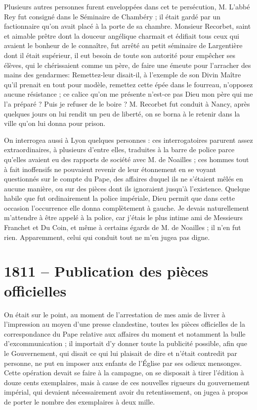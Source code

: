 \documentclass[11pt,a4paper]{report}
\begin{document}
Plusieurs autres personnes furent enveloppées dans cet te persécution, M. L'abbé Rey fut consigné dans le Séminaire de Chambéry ; il était gardé par un factionnaire qu'on avait placé à la porte de sa chambre. Monsieur Recorbet, saint et aimable prêtre dont la douceur angélique charmait et édifiait tous ceux qui avaient le bonheur de le connaître, fut arrêté au petit séminaire de Largentière dont il était supérieur, il eut besoin de toute son autorité pour empêcher ses élèves, qui le chérissaient comme un père, de faire une émeute pour l'arracher des mains des gendarmes: Remettez-leur disait-il, à l'exemple de son Divin Maître qu'il prenait en tout pour modèle, remettez cette épée dans le fourreau, n'opposez aucune résistance ; ce calice qu'on me présente n'est-ce pas Dieu mon père qui me l'a préparé ? Puis je refuser de le boire ? M. Recorbet fut conduit à Nancy, après quelques jours on lui rendit un peu de liberté, on se borna à le retenir dans la ville qu'on lui donna pour prison.

On interrogea aussi à Lyon quelques personnes : ces interrogatoires parurent assez extraordinaires, à plusieurs d'entre elles, traduites à la barre de police parce qu'elles avaient eu des rapports de société avec M. de Noailles ; ces hommes tout à fait inoffensifs ne pouvaient revenir de leur étonnement en se voyant questionnés sur le compte du Pape, des affaires duquel ils ne s'étaient mêlés en aucune manière, ou sur des pièces dont ils ignoraient jusqu'à l'existence. Quelque habile que fut ordinairement la police impériale, Dieu permit que dans cette occasion l'occurrence elle donna complètement à gauche. Je devais naturellement m'attendre à être appelé à la police, car j'étais le plus intime ami de Messieurs Franchet et Du Coin, et même à certains égards de M. de Noailles ; il n'en fut rien. Apparemment, celui qui conduit tout ne m'en jugea pas digne.

\section*{1811 -- Publication des pièces officielles}

On était sur le point, au moment de l'arrestation de mes amis de livrer à l'impression au moyen d'une presse clandestine, toutes les pièces officielles de la correspondance du Pape relative aux affaires du moment et notamment la bulle d'excommunication ; il importait d'y donner toute la publicité possible, afin que le Gouvernement, qui disait ce qui lui plaisait de dire et n'était contredit par personne, ne put en imposer aux enfants de l'Église par ses odieux mensonges. Cette opération devait se faire à la campagne, on se disposait à tirer l'édition à douze cents exemplaires, mais à cause de ces nouvelles rigueurs du gouvernement impérial, qui devaient nécessairement avoir du retentissement, on jugea à propos de porter le nombre des exemplaires à deux mille.
\end{document}
